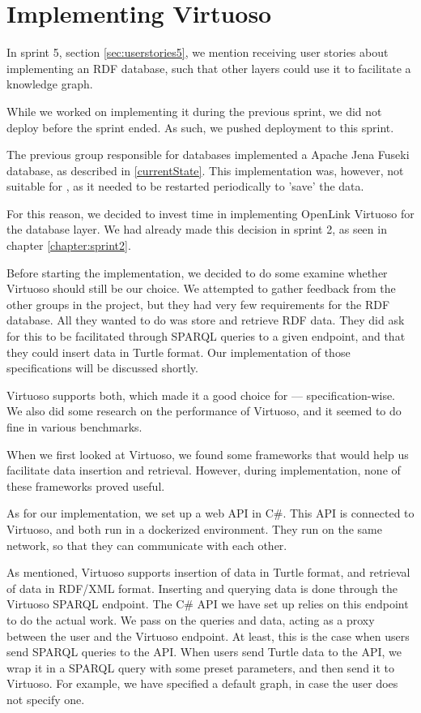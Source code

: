 \section{Implementing Virtuoso}
In sprint 5, section \ref{sec:userstories5}, we mention receiving user stories about implementing an RDF database, such that other \knox{} layers could use it to facilitate a knowledge graph.

While we worked on implementing it during the previous sprint, we did not deploy before the sprint ended. As such, we pushed deployment to this sprint.

The previous group responsible for \knox{} databases implemented a Apache Jena Fuseki database, as described in \ref{currentState}.
This implementation was, however, not suitable for \knox{}, as it needed to be restarted periodically to 'save' the data.

For this reason, we decided to invest time in implementing OpenLink Virtuoso for the \knox{} database layer. We had already made this decision in sprint 2, as seen in chapter \ref{chapter:sprint2}.

Before starting the implementation, we decided to do some examine whether Virtuoso should still be our choice.
We attempted to gather feedback from the other groups in the \knox{} project, but they had very few requirements for the RDF database. All they wanted to do was store and retrieve RDF data.
They did ask for this to be facilitated through SPARQL queries to a given endpoint, and that they could insert data in Turtle format. Our implementation of those specifications will be discussed shortly.

Virtuoso supports both, which made it a good choice for \knox{} --- specification-wise. We also did some research on the performance of Virtuoso, and it seemed to do fine in various benchmarks\cite{addleseeComparingLinkedData2019}\cite{jovanovikBenchmarkingVirtuosoMighty2018}.

When we first looked at Virtuoso, we found some frameworks that would help us facilitate data insertion and retrieval. However, during implementation, none of these frameworks proved useful.

As for our implementation, we set up a web API in C\#. This API is connected to Virtuoso, and both run in a dockerized environment. They run on the same network, so that they can communicate with each other.

As mentioned, Virtuoso supports insertion of data in Turtle format, and retrieval of data in RDF/XML format. Inserting and querying data is done through the Virtuoso SPARQL endpoint. The C\# API we have set up relies on this endpoint to do the actual work. We pass on the queries and data, acting as a proxy between the user and the Virtuoso endpoint. At least, this is the case when users send SPARQL queries to the API. When users send Turtle data to the API, we wrap it in a SPARQL query with some preset parameters, and then send it to Virtuoso. For example, we have specified a default graph, in case the user does not specify one.

